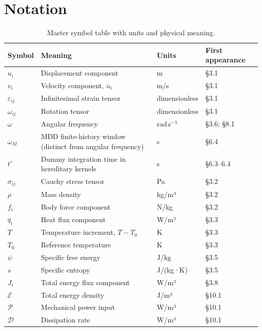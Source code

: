 \section*{Notation}

\begin{table}[htbp]
\centering
\small
\caption{Master symbol table with units and physical meaning.}
\label{tab:notation}
\begin{tabularx}{\textwidth}{@{}p{1.8cm}X p{2.2cm}p{2.1cm}@{}}
\toprule
\textbf{Symbol} & \textbf{Meaning} & \textbf{Units} & \textbf{First appearance} \\
\midrule
$u_i$ & Displacement component & m & §3.1 \\
$v_i$ & Velocity component, $\dot{u}_i$ & m/s & §3.1 \\
$\varepsilon_{ij}$ & Infinitesimal strain tensor & dimensionless & §3.1 \\
$\omega_{ij}$ & Rotation tensor & dimensionless & §3.1 \\
$\omega$ & Angular frequency & rad\,s$^{-1}$ & §3.6; §8.1 \\
$\omega_M$ & MDD finite-history window (distinct from angular frequency) & s & §6.4 \\
$t'$ & Dummy integration time in hereditary kernels & s & §6.3--6.4 \\
$\sigma_{ij}$ & Cauchy stress tensor & Pa & §3.2 \\
$\rho$ & Mass density & kg/m³ & §3.2 \\
$f_i$ & Body force component & N/kg & §3.2 \\
$q_i$ & Heat flux component & W/m² & §3.3 \\
$T$ & Temperature increment, $T - T_0$ & K & §3.3 \\
$T_0$ & Reference temperature & K & §3.3 \\
$\psi$ & Specific free energy & J/kg & §3.5 \\
$s$ & Specific entropy & J/(kg·K) & §3.5 \\
$J_i$ & Total energy flux component & W/m² & §3.8 \\
$\mathcal{E}$ & Total energy density & J/m³ & §10.1 \\
$\mathcal{P}$ & Mechanical power input & W/m³ & §10.1 \\
$\mathcal{D}$ & Dissipation rate & W/m³ & §10.1 \\

\end{tabularx}
\end{table}
